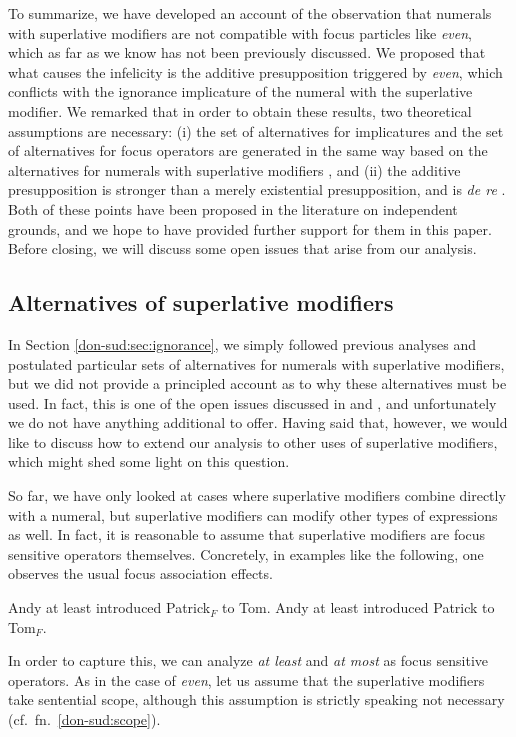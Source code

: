 \documentclass[output=paper]{langscibook}
\begin{document}
To summarize, we have developed an account of the observation that numerals with superlative modifiers are not compatible with focus particles like \textit{even}, which as far as we know has not been previously discussed. We proposed that what causes the infelicity is the additive presupposition triggered by \textit{even}, which conflicts with the ignorance implicature of the numeral with the superlative modifier. We remarked that in order to obtain these results, two theoretical assumptions are necessary: (i) the set of alternatives for implicatures and the set of alternatives for focus operators are generated in the same way based on the alternatives for numerals with superlative modifiers \citep{foxkatzir, rooth:92, mendia}, and (ii) the additive presupposition is stronger than a merely existential presupposition, and is \textit{de re} \citep{kripke, geurtsvandersandt}. Both of these points have been proposed in the literature on independent grounds, and we hope to have provided further support for them in this paper. Before closing, we will discuss some open issues that arise from our analysis.

\subsection{Alternatives of superlative modifiers}

In Section \ref{don-sud:sec:ignorance}, we simply followed previous analyses and postulated particular sets of alternatives for numerals with superlative modifiers, but we did not provide a principled account as to why these alternatives must be used. In fact, this is one of the open issues discussed in \citet{schwarz} and \citet{mayr}, and unfortunately we do not have anything additional to offer. Having said that, however, we would like to discuss how to extend our analysis to other uses of superlative modifiers, which might shed some light on this question.

So far, we have only looked at cases where superlative modifiers combine directly with a numeral, but superlative modifiers can modify other types of expressions as well. In fact, it is reasonable to assume that superlative modifiers are focus sensitive operators themselves. Concretely, in examples like the following, one observes the usual focus association effects.

\ea
  \ea Andy at least introduced Patrick$_F$ to Tom.
  \ex Andy at least introduced Patrick to Tom$_F$.
  \z
\z

\noindent In order to capture this, we can analyze \textit{at least} and \textit{at most} as focus sensitive operators. As in the case of \textit{even}, let us assume that the superlative modifiers take sentential scope, although this assumption is strictly speaking not necessary (cf.\ fn.~\ref{don-sud:scope}).
\end{document}
